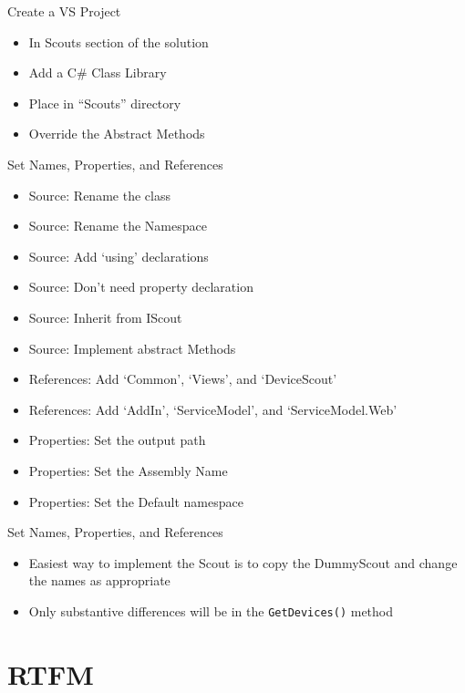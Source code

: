 \documentclass[11pt]{beamer}
\begin{document}
\begin{frame}{Create a VS Project}
    \begin{itemize}
        \item In Scouts section of the solution
        \item Add a C\# Class Library
        \item Place in ``Scouts'' directory
        \item Override the Abstract Methods
    \end{itemize}
\end{frame}

\begin{frame}{Set Names, Properties, and References}
    \begin{itemize}
        \item Source: Rename the class
        \item Source: Rename the Namespace
        \item Source: Add `using' declarations
        \item Source: Don't need property declaration
        \item Source: Inherit from IScout
        \item Source: Implement abstract Methods
        \item References: Add `Common', `Views', and `DeviceScout'
        \item References: Add `AddIn', `ServiceModel', and `ServiceModel.Web'
        \item Properties: Set the output path
        \item Properties: Set the Assembly Name
        \item Properties: Set the Default namespace
    \end{itemize}
\end{frame}

\begin{frame}{Set Names, Properties, and References}
    \begin{itemize}
        \item Easiest way to implement the Scout is to copy the DummyScout and change the names as appropriate
        \item Only substantive differences will be in the \texttt{GetDevices()} method
    \end{itemize}
\end{frame}

\section{RTFM}
\end{document}

